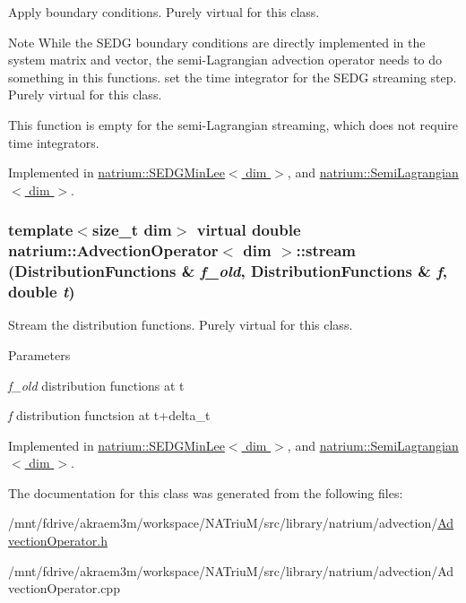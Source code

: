 Apply boundary conditions. Purely virtual for this class. \begin{DoxyNote}{Note}
While the SEDG boundary conditions are directly implemented in the system matrix and vector, the semi-\/Lagrangian advection operator needs to do something in this functions. set the time integrator for the SEDG streaming step. Purely virtual for this class. 

This function is empty for the semi-\/Lagrangian streaming, which does not require time integrators. 
\end{DoxyNote}


Implemented in \hyperlink{classnatrium_1_1SEDGMinLee_add96facb8df190a139505ea912bb1a75}{natrium::SEDGMinLee$<$ dim $>$}, and \hyperlink{classnatrium_1_1SemiLagrangian_ac11ac59a28176a74e94fde81362ce7b5}{natrium::SemiLagrangian$<$ dim $>$}.\hypertarget{classnatrium_1_1AdvectionOperator_abccc060e37071fa776cd6e9fc6cc7987}{
\subsubsection[{stream}]{\setlength{\rightskip}{0pt plus 5cm}template$<$size\_\-t dim$>$ virtual double {\bf natrium::AdvectionOperator}$<$ dim $>$::stream ({\bf DistributionFunctions} \& {\em f\_\-old}, \/  {\bf DistributionFunctions} \& {\em f}, \/  double {\em t})}}
\label{classnatrium_1_1AdvectionOperator_abccc060e37071fa776cd6e9fc6cc7987}


Stream the distribution functions. Purely virtual for this class. 
\begin{DoxyParams}{Parameters}
\item[{\em f\_\-old}]distribution functions at t \item[{\em f}]distribution functsion at t+delta\_\-t \end{DoxyParams}


Implemented in \hyperlink{classnatrium_1_1SEDGMinLee_a6a343b581a1e2ffdf0806b140ca82c9e}{natrium::SEDGMinLee$<$ dim $>$}, and \hyperlink{classnatrium_1_1SemiLagrangian_a03956c49c0bd288340b734f2fa9aad3c}{natrium::SemiLagrangian$<$ dim $>$}.

The documentation for this class was generated from the following files:\begin{DoxyCompactItemize}
\item 
/mnt/fdrive/akraem3m/workspace/NATriuM/src/library/natrium/advection/\hyperlink{AdvectionOperator_8h}{AdvectionOperator.h}\item 
/mnt/fdrive/akraem3m/workspace/NATriuM/src/library/natrium/advection/AdvectionOperator.cpp\end{DoxyCompactItemize}
